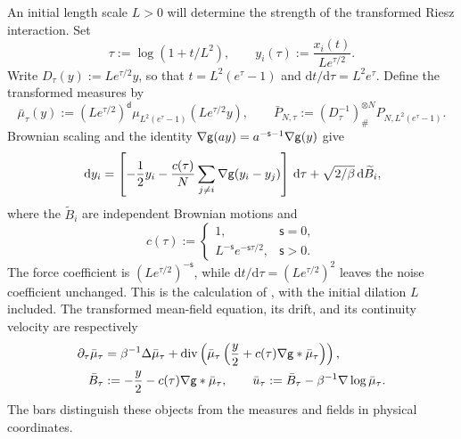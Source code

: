 \documentclass[11pt,reqno]{amsart}
\numberwithin{equation}{section}
\theoremstyle{plain}
\theoremstyle{remark}
\renewcommand{\d}{\mathsf{d}}\newcommand{\s}{\mathsf{s}}
\DeclareMathOperator{\diver}{div}
\begin{document}
An initial length scale $L>0$ will determine the strength of the transformed Riesz interaction. Set
\begin{equation}\label{eq:selfsimilar}
 \tau:=\log(1+t/L^2),\qquad
 y_i(\tau):=\frac{x_i(t)}{L e^{\tau/2}}.
\end{equation}
Write $D_\tau(y):=Le^{\tau/2}y$, so that $t=L^2(e^\tau-1)$ and $\mathrm dt/\mathrm d\tau=L^2e^\tau$. Define the transformed measures by
\begin{equation}\label{eq:selfsimilar-measures}
 \bar\mu_\tau(y):=(Le^{\tau/2})^\d\mu_{L^2(e^\tau-1)}(Le^{\tau/2}y),\qquad
 \bar P_{N,\tau}:=(D_\tau^{-1})^{\otimes N}_{\#}P_{N,L^2(e^\tau-1)}.
\end{equation}
Brownian scaling and the identity $\nabla\g(ay)=a^{-\s-1}\nabla\g(y)$ give
\begin{equation}\label{eq:transformed-sde}
 \,\mathrm d y_i=\left[-\frac12y_i-
       \frac{c(\tau)}N\sum_{j\ne i}\nabla\mathsf g(y_i-y_j)\right]\,\mathrm d\tau
                  +\sqrt{2/\beta}\,\mathrm d\widetilde B_i,
\end{equation}
where the $\widetilde B_i$ are independent Brownian motions and
\begin{equation}\label{eq:selfsimilar-coupling}
 c(\tau):=\begin{cases}1,&\s=0,\\ L^{-\s}e^{-\s\tau/2},&\s>0.\end{cases}
\end{equation}
The force coefficient is $(Le^{\tau/2})^{-\s}$, while $\mathrm dt/\mathrm d\tau=(Le^{\tau/2})^2$ leaves the noise coefficient unchanged. This is the calculation of \cite[Lemma~2.1]{RSselfsimilar}, with the initial dilation $L$ included. The transformed mean-field equation, its drift, and its continuity velocity are respectively
\begin{align}
 \partial_\tau\bar\mu_\tau
 &=\beta^{-1}\Delta\bar\mu_\tau+
       \diver\left(\bar\mu_\tau\left(\frac y2+c(\tau)\nabla\g*\bar\mu_\tau\right)\right),
       \label{eq:selfsimilar-mf}\\
 \bar B_\tau&:=-\frac y2-c(\tau)\nabla\g*\bar\mu_\tau,\qquad
 \bar u_\tau:=\bar B_\tau-\beta^{-1}\nabla\log\bar\mu_\tau.
       \label{eq:selfsimilar-drift-velocity}
\end{align}
The bars distinguish these objects from the measures and fields in physical coordinates.
\end{document}
